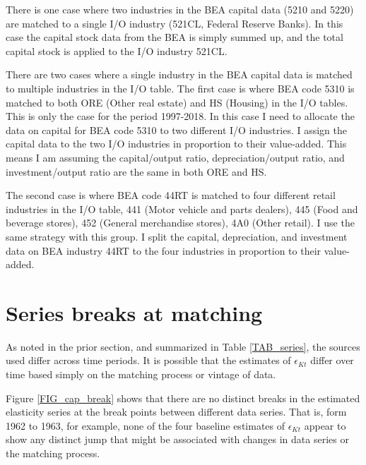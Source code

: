 \documentclass[11pt]{article}
\begin{document}
There is one case where two industries in the BEA capital data (5210 and 5220) are matched to a single I/O industry (521CL, Federal Reserve Banks). In this case the capital stock data from the BEA is simply summed up, and the total capital stock is applied to the I/O industry 521CL. 

There are two cases where a single industry in the BEA capital data is matched to multiple industries in the I/O table. The first case is where BEA code 5310 is matched to both ORE (Other real estate) and HS (Housing) in the I/O tables. This is only the case for the period 1997-2018. In this case I need to allocate the data on capital for BEA code 5310 to two different I/O industries. I assign the capital data to the two I/O industries in proportion to their value-added. This means I am assuming the capital/output ratio, depreciation/output ratio, and investment/output ratio are the same in both ORE and HS. 
	
The second case is where BEA code 44RT is matched to four different retail industries in the I/O table, 441 (Motor vehicle and parts dealers), 445 (Food and beverage stores), 452 (General merchandise stores), 4A0 (Other retail). I use the same strategy with this group. I split the capital, depreciation, and investment data on BEA industry 44RT to the four industries in proportion to their value-added.

\section{Series breaks at matching}
As noted in the prior section, and summarized in Table \ref{TAB_series}, the sources used differ across time periods. It is possible that the estimates of $\epsilon_{Kt}$ differ over time based simply on the matching process or vintage of data. 

Figure \ref{FIG_cap_break} shows that there are no distinct breaks in the estimated elasticity series at the break points between different data series. That is, form 1962 to 1963, for example, none of the four baseline estimates of $\epsilon_{Kt}$ appear to show any distinct jump that might be associated with changes in data series or the matching process.
\end{document}
